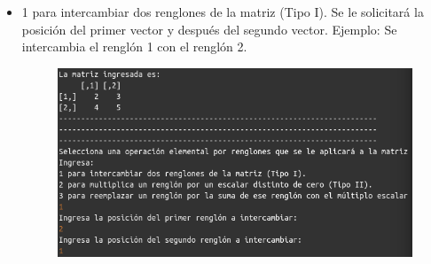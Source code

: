 \documentclass[11pt,letterpaper]{article}
\begin{document}
\begin{enumerate}
\begin{itemize}
\begin{itemize}
\item 1 para intercambiar dos renglones de la matriz (Tipo I). Se le solicitará la posición del primer vector y después del segundo vector. Ejemplo: Se intercambia el renglón 1 con el renglón 2.
\begin{figure}[H]
\centering
\includegraphics[scale=.7]{paso_5_11.png}
\end{figure}


\end{itemize}
\end{itemize}
\end{enumerate}
\end{document}
